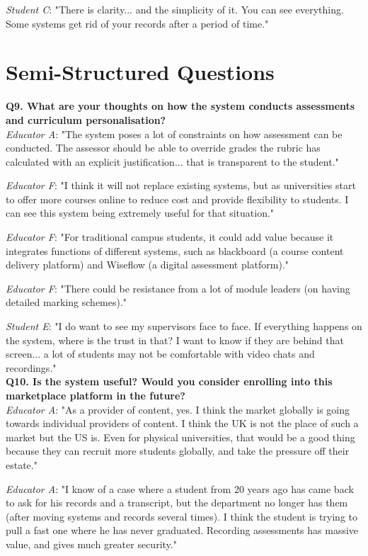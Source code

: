 \textit{Student C}: "There is clarity... and the simplicity of it. You can see everything. Some systems get rid
of your records after a period of time."\\

\section{Semi-Structured Questions}

\textbf{Q9. What are your thoughts on how the system conducts assessments and curriculum personalisation?}\\

\textit{Educator A}: "The system poses a lot of constraints on how assessment can be conducted.
The assessor should be able to override grades the rubric has calculated with an explicit justification...
that is transparent to the student."

\textit{Educator F}: "I think it will not replace existing systems, but as universities start to offer more
courses online to reduce cost and provide flexibility to students. I can see this system being extremely useful
for that situation."

\textit{Educator F}: "For traditional campus students, it could add value because it integrates functions of different systems,
such as blackboard (a course content delivery platform) and Wiseflow (a digital assessment platform)."

\textit{Educator F}: "There could be resistance from a lot of module leaders (on having detailed marking schemes)."

\textit{Student E}: "I do want to see my supervisors face to face. If everything happens on the system, 
where is the trust in that? I want to know if they are behind that screen... a lot of students may not be comfortable 
with video chats and recordings."\\

\textbf{Q10. Is the system useful? Would you consider enrolling into this marketplace platform in the future?}\\

\textit{Educator A}: "As a provider of content, yes. I think the market globally is going towards
individual providers of content. I think the UK is not the place of such a market but the US is.
Even for physical universities, that would be a good thing because they can recruit more students globally, and
take the pressure off their estate."

\textit{Educator A}: "I know of a case where a student from 20 years ago has came back to ask for his records
and a transcript, but the department no longer has them (after moving systems and records several times).
I think the student is trying to pull a fast one where he has never graduated. Recording assessments has massive value,
and gives much greater security."


